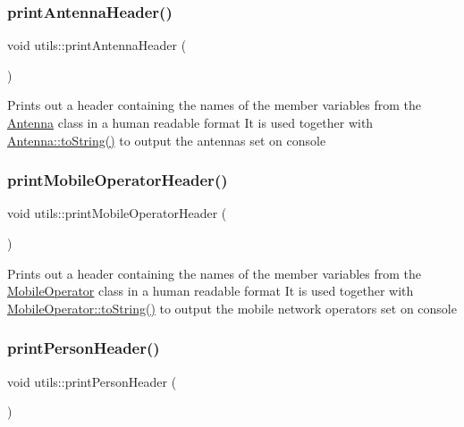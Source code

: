 \subsubsection{\texorpdfstring{printAntennaHeader()}{printAntennaHeader()}}
{\footnotesize\ttfamily void utils\+::print\+Antenna\+Header (\begin{DoxyParamCaption}{ }\end{DoxyParamCaption})}

Prints out a header containing the names of the member variables from the \mbox{\hyperlink{class_antenna}{Antenna}} class in a human readable format It is used together with \mbox{\hyperlink{class_antenna_a7fea30e065f49a3cbcee02f60bd033c8}{Antenna\+::to\+String()}} to output the antennas set on console \mbox{\label{namespaceutils_a207e9d12cc075f601c7fa32ac010b346}} 
\subsubsection{\texorpdfstring{printMobileOperatorHeader()}{printMobileOperatorHeader()}}
{\footnotesize\ttfamily void utils\+::print\+Mobile\+Operator\+Header (\begin{DoxyParamCaption}{ }\end{DoxyParamCaption})}

Prints out a header containing the names of the member variables from the \mbox{\hyperlink{class_mobile_operator}{Mobile\+Operator}} class in a human readable format It is used together with \mbox{\hyperlink{class_mobile_operator_aa83724a149499ef10678ad651a5b40df}{Mobile\+Operator\+::to\+String()}} to output the mobile network operators set on console \mbox{\label{namespaceutils_a1978a6ccb2360773215aba027d8b6f08}} 
\subsubsection{\texorpdfstring{printPersonHeader()}{printPersonHeader()}}
{\footnotesize\ttfamily void utils\+::print\+Person\+Header (\begin{DoxyParamCaption}{ }\end{DoxyParamCaption})}

